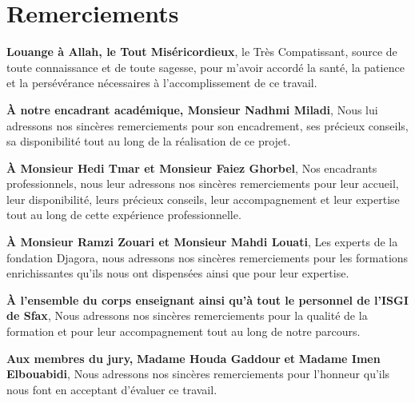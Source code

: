 
\chapter*{Remerciements}

\textbf{Louange à Allah, le Tout Miséricordieux}, le Très Compatissant, source de toute connaissance et de toute sagesse, pour m'avoir accordé la santé, la patience et la persévérance nécessaires à l'accomplissement de ce travail.

\vspace{12pt}

\noindent  \textbf{À notre encadrant académique, Monsieur Nadhmi Miladi},
Nous lui adressons nos sincères remerciements pour son encadrement, ses précieux conseils, sa disponibilité tout au long de la réalisation de ce projet.

\vspace{12pt}

\noindent \textbf{À Monsieur Hedi Tmar et Monsieur Faiez Ghorbel},
Nos encadrants professionnels, nous leur adressons nos sincères remerciements pour leur accueil, leur disponibilité, leurs précieux conseils, leur accompagnement et leur expertise tout au long de cette expérience professionnelle.

\vspace{12pt}

\noindent \textbf{À Monsieur Ramzi Zouari et Monsieur Mahdi Louati},
Les experts de la fondation Djagora, nous adressons nos sincères remerciements pour les formations enrichissantes qu'ils nous ont dispensées ainsi que pour leur expertise.

\vspace{12pt}

\noindent \textbf{À l'ensemble du corps enseignant ainsi qu'à tout le personnel de l'ISGI de Sfax},
Nous adressons nos sincères remerciements pour la qualité de la formation et pour leur accompagnement tout au long de notre parcours.

\vspace{12pt}

\noindent \textbf{Aux membres du jury,} \textbf{Madame Houda Gaddour} \textbf{et} \textbf{Madame Imen Elbouabidi},
Nous adressons nos sincères remerciements pour l'honneur qu'ils nous font en acceptant d'évaluer ce travail.

\newpage
